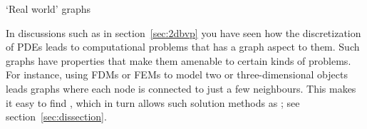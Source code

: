\begin{comment}
\Level 1 {Sample implementation}

We assume that we have types \lstinline{vectorvalue} and \lstinline{matrixvalue}:
\begin{itemize}
\item
  vector values can take on a numerical value, or have a exceptional
  value \lstinline{undefined};
\item matrix values are \lstinline{empty}/\lstinline{filled}
  for \indextermsub{unweighted}{graph}s,
  or any numerical value for \indextermsub{weighted}{graph}s.
\end{itemize}

The most important part of the code is the matrix-vector multiplication;
we give the left multiplication since that is most common in graph computations.
%
\cxxverbatimsnippet{graphmultiply}
%
The multiplication routine takes two function pointers:
\begin{itemize}
\item a multiplication function for vector and matrix elements; and
\item an addition function for performing a reduction on vector elements.
\end{itemize}

We demonstrate this with two simple examples.
First we do a single matrix-vector multiplication,
with a matrix that connects each node to its successor
modulo the matrix size:
\[ m_{ij} = \delta_{i+1,j} \]
We apply this to a vector corresponding to a single vertex:
%
\snippetwithoutput{graphshift}{code/graph}{graph1}

In the second example we take the same matrix,
but now compute the single-source shortest path to each node.
This makes the multiplication and addition routines
marginally more complex:
%
\cxxverbatimsnippet{graphpathmultadd}

We now apply the matrix-vector multiplication
until we have found the distance to each vertex:
%
\snippetwithoutput{graphdistloop}{code/graph}{graph2}
\end{comment}

 {`Real world' graphs}

In discussions such as in section~\ref{sec:2dbvp} you have seen how
the discretization of \acp{PDE} leads to computational problems that
has a graph aspect to them. Such graphs have properties that make them
amenable to certain kinds of problems.
%
For instance, using \acp{FDM} or \acp{FEM} to model two or
three-dimensional objects leads graphs where each node is connected to
just a few neighbours. This makes it easy to find
, which in turn allows such solution methods as
; see section~\ref{sec:dissection}.

